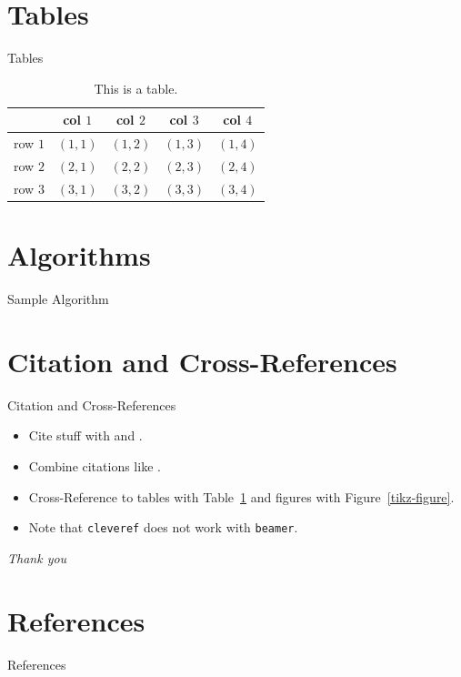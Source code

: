 \documentclass[hyperref={pdfpagemode=UseOutlines},xcolor=dvipsnames,notheorems]{beamer}
\begin{document}
\section{Tables}
\begin{frame}{Tables}
	\begin{table}[H]
		\centering
		\caption{This is a table.}
		\label{table1}
		\begin{tabular}{lcccc}
			\toprule
			& col $1$ & col $2$ & col $3$ & col  $4$ \\
			\midrule
			row $1$ & $(1,1)$ & $(1,2)$ & $(1,3)$ & $(1,4)$ \\
			row $2$ & $(2,1)$ & $(2,2)$ & $(2,3)$ & $(2,4)$ \\
			row $3$ & $(3,1)$ & $(3,2)$ & $(3,3)$ & $(3,4)$ \\
			\bottomrule
		\end{tabular}
	\end{table}
\end{frame}

\section{Algorithms}
\begin{frame}{Sample Algorithm}
	\begin{center} %
	\end{center}
\end{frame}

\section{Citation and Cross-References}
\begin{frame}{Citation and Cross-References}
	\begin{itemize}
		\item Cite stuff with \cite{article} and \cite{misc}.
		\item Combine citations like \cite{book,incollection}.
		\item Cross-Reference to tables with Table~\ref{table1} and figures with Figure~\ref{tikz-figure}.
		\item Note that \texttt{cleveref} does not work with \texttt{beamer}.
	\end{itemize}
\end{frame}

\begin{frame}
	\centering \Large
	\emph{Thank you}
\end{frame}

\section{References}
\begin{frame}[allowframebreaks]{References}
	\nocite{*}
	\printbibliography
\end{frame}
\end{document}
